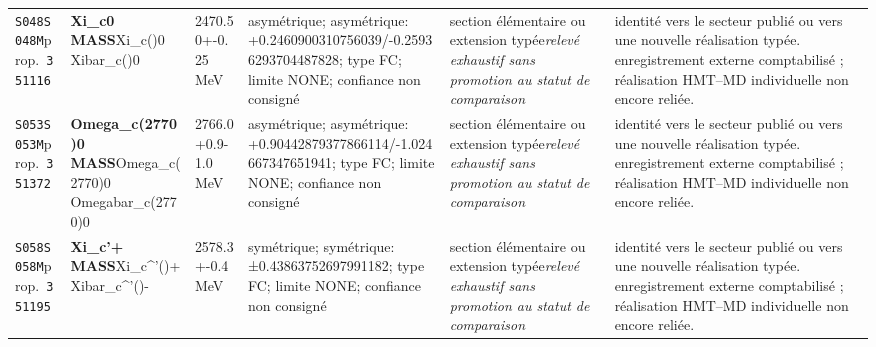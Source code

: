\begin{landscape}
\begin{longtable}{L{1.85cm}L{4.45cm}L{2.35cm}L{4.05cm}L{3.35cm}L{7.15cm}}
\texttt{S048}\newline \texttt{S048M}\newline prop.\ \texttt{351116} & \textbf{Xi\_\allowbreak{}c0 MASS}\newline Xi\_\allowbreak{}c()0 \textbar{}\allowbreak{} Xibar\_\allowbreak{}c()0 & 2470.50+-0.25\,MeV & asymétrique; asymétrique: +0.2460900310756039/-0.25936293704487828; type FC; limite NONE; confiance non consigné & section élémentaire ou extension typée\newline \emph{relevé exhaustif sans promotion au statut de comparaison} & identité vers le secteur publié ou vers une nouvelle réalisation typée. enregistrement externe comptabilisé ; réalisation HMT--MD individuelle non encore reliée. \\
\texttt{S053}\newline \texttt{S053M}\newline prop.\ \texttt{351372} & \textbf{Omega\_\allowbreak{}c(2770)0 MASS}\newline Omega\_\allowbreak{}c(2770)0 \textbar{}\allowbreak{} Omegabar\_\allowbreak{}c(2770)0 & 2766.0+0.9-1.0\,MeV & asymétrique; asymétrique: +0.90442879377866114/-1.024667347651941; type FC; limite NONE; confiance non consigné & section élémentaire ou extension typée\newline \emph{relevé exhaustif sans promotion au statut de comparaison} & identité vers le secteur publié ou vers une nouvelle réalisation typée. enregistrement externe comptabilisé ; réalisation HMT--MD individuelle non encore reliée. \\
\texttt{S058}\newline \texttt{S058M}\newline prop.\ \texttt{351195} & \textbf{Xi\_\allowbreak{}c'+ MASS}\newline Xi\_\allowbreak{}c\textasciicircum{}'()+ \textbar{}\allowbreak{} Xibar\_\allowbreak{}c\textasciicircum{}'()- & 2578.3+-0.4\,MeV & symétrique; symétrique: ±0.43863752697991182; type FC; limite NONE; confiance non consigné & section élémentaire ou extension typée\newline \emph{relevé exhaustif sans promotion au statut de comparaison} & identité vers le secteur publié ou vers une nouvelle réalisation typée. enregistrement externe comptabilisé ; réalisation HMT--MD individuelle non encore reliée. \\

\end{longtable}
\end{landscape}
